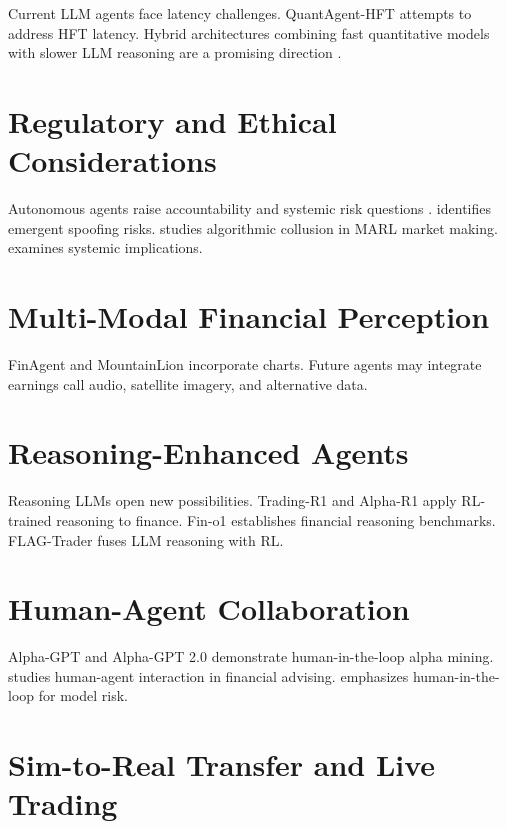 \documentclass[12pt]{report}
\begin{document}
Current LLM agents face latency challenges. QuantAgent-HFT \citep{xiong2025quantagenthft} attempts to address HFT latency. Hybrid architectures combining fast quantitative models with slower LLM reasoning are a promising direction \citep{xiong2025flagtrader,benhenda2025finrldeepseek}.

\section{Regulatory and Ethical Considerations}

Autonomous agents raise accountability and systemic risk questions \citep{arner2017fintech}. \citet{kurshan2025agenticregulator} identifies emergent spoofing risks. \citet{wang2025marlmm} studies algorithmic collusion in MARL market making. \citet{aiagentsmarkets2026} examines systemic implications.

\section{Multi-Modal Financial Perception}

FinAgent \citep{zhang2024finagent} and MountainLion \citep{wu2025mountainlion} incorporate charts. Future agents may integrate earnings call audio, satellite imagery, and alternative data.

\section{Reasoning-Enhanced Agents}

Reasoning LLMs open new possibilities. Trading-R1 \citep{xiao2025tradingr1} and Alpha-R1 \citep{jiang2025alphar1} apply RL-trained reasoning to finance. Fin-o1 \citep{qian2025fino1} establishes financial reasoning benchmarks. FLAG-Trader \citep{xiong2025flagtrader} fuses LLM reasoning with RL.

\section{Human-Agent Collaboration}

Alpha-GPT \citep{wang2025alphagpt} and Alpha-GPT 2.0 \citep{yuan2024alphagpt2} demonstrate human-in-the-loop alpha mining. \citet{takayanagi2025advisor} studies human-agent interaction in financial advising. \citet{okpala2025agenticfinancial} emphasizes human-in-the-loop for model risk.

\section{Sim-to-Real Transfer and Live Trading}
\end{document}
